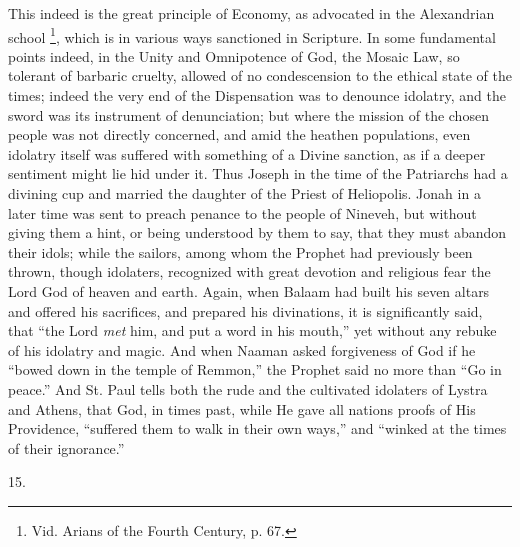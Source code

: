 This indeed is the great principle of Economy, as advocated in the
Alexandrian school \footnote{Vid. Arians of the Fourth
Century, p. 67.}, which
is in various ways sanctioned in Scripture. In some fundamental points
indeed, in the Unity and Omnipotence of God, the Mosaic Law, so
tolerant of barbaric cruelty, allowed of no condescension to the
ethical state of the times; indeed the very end of the Dispensation
was to denounce idolatry, and the sword was its instrument of
denunciation; but where the mission of the chosen people was not
directly concerned, and amid the heathen populations, even idolatry
itself was suffered with something of a Divine sanction, as if a
deeper sentiment might lie hid under it. Thus Joseph in the time of
the Patriarchs had a divining cup and married the daughter of the
Priest of Heliopolis. Jonah in a later time was sent to preach penance
to the people of Nineveh, but without giving them a hint, or being
understood by them to say, that they must abandon their idols; while
the sailors, among whom the Prophet had previously been thrown, though
idolaters, recognized with great devotion and religious fear the Lord
God of heaven and earth. Again, when Balaam had built his seven
altars and offered his sacrifices, and prepared his divinations, it is
significantly said, that ``the Lord \emph{met} him, and put a word
in his mouth,'' yet without any rebuke of his idolatry and magic.
And when Naaman asked forgiveness of God if he ``bowed down in the
temple of Remmon,'' the Prophet said no more than ``Go in
peace.'' And St. Paul tells both the rude and the cultivated
idolaters of Lystra and Athens, that God, in times past, while He gave
all nations proofs of His Providence, ``suffered them to walk in
their own ways,'' and ``winked at the times of their
ignorance.''

15.

